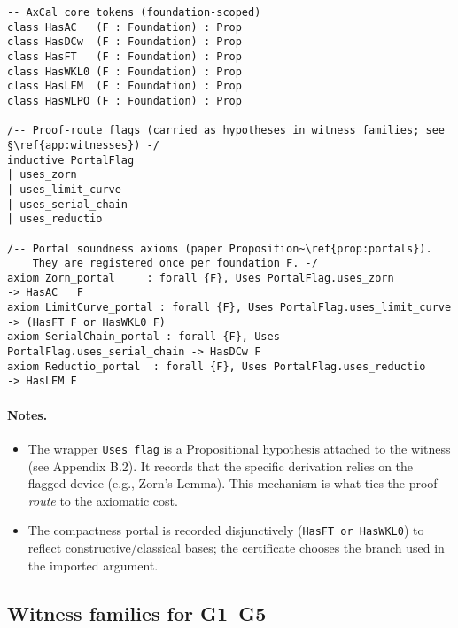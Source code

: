 \documentclass[11pt]{article}
\theoremstyle{definition}
\theoremstyle{remark}
\begin{document}
\begin{verbatim}
-- AxCal core tokens (foundation-scoped)
class HasAC   (F : Foundation) : Prop
class HasDCw  (F : Foundation) : Prop
class HasFT   (F : Foundation) : Prop
class HasWKL0 (F : Foundation) : Prop
class HasLEM  (F : Foundation) : Prop
class HasWLPO (F : Foundation) : Prop

/-- Proof-route flags (carried as hypotheses in witness families; see §\ref{app:witnesses}) -/
inductive PortalFlag
| uses_zorn
| uses_limit_curve
| uses_serial_chain
| uses_reductio

/-- Portal soundness axioms (paper Proposition~\ref{prop:portals}). 
    They are registered once per foundation F. -/
axiom Zorn_portal     : forall {F}, Uses PortalFlag.uses_zorn         -> HasAC   F
axiom LimitCurve_portal : forall {F}, Uses PortalFlag.uses_limit_curve -> (HasFT F or HasWKL0 F)
axiom SerialChain_portal : forall {F}, Uses PortalFlag.uses_serial_chain -> HasDCw F
axiom Reductio_portal  : forall {F}, Uses PortalFlag.uses_reductio     -> HasLEM F
\end{verbatim}

\paragraph{Notes.}
\begin{itemize}
\item The wrapper \verb|Uses flag| is a Propositional hypothesis attached to the witness (see Appendix B.2). It records that the specific derivation relies on the flagged device (e.g., Zorn's Lemma). This mechanism is what ties the proof \emph{route} to the axiomatic cost.
\item The compactness portal is recorded disjunctively (\verb|HasFT or HasWKL0|) to reflect constructive/classical bases; the certificate chooses the branch used in the imported argument.
\end{itemize}

\subsection{Witness families for G1--G5}\label{app:witnesses}
\end{document}
